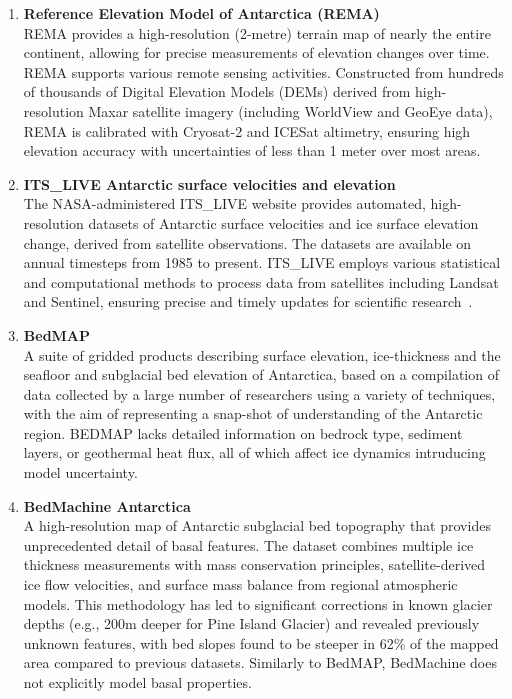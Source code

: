 \begin{enumerate}
    \item\textbf{Reference Elevation Model of Antarctica (REMA)}\\
    REMA provides a high-resolution (2-metre) terrain map of nearly the entire continent, allowing for precise measurements of elevation changes over time. REMA supports various remote sensing activities. Constructed from hundreds of thousands of Digital Elevation Models (DEMs) derived from high-resolution Maxar satellite imagery (including WorldView and GeoEye data), REMA is calibrated with Cryosat-2 and ICESat altimetry, ensuring high elevation accuracy with uncertainties of less than 1 meter over most areas\cite{REMA}.

    \item\textbf{ITS\_LIVE Antarctic surface velocities and elevation}\\
    The NASA-administered ITS\_LIVE website provides automated, high-resolution datasets of Antarctic surface velocities and ice surface elevation change, derived from satellite observations. The datasets are available on annual timesteps from 1985 to present. ITS\_LIVE employs various statistical and computational methods to process data from satellites including Landsat and Sentinel, ensuring precise and timely updates for scientific research~\cite{itslive}.

    \item\textbf{BedMAP}\\ 
    A suite of gridded products describing surface elevation, ice-thickness and the seafloor and subglacial bed elevation of Antarctica, based on a compilation of data collected by a large number of researchers using a variety of techniques, with the aim of representing a snap-shot of understanding of the Antarctic region\cite{Fretwell_2013}. BEDMAP lacks detailed information on bedrock type, sediment layers, or geothermal heat flux, all of which affect ice dynamics intruducing model uncertainty.

    \item\textbf{BedMachine Antarctica}\\
    A high-resolution map of Antarctic subglacial bed topography that provides unprecedented detail of basal features. The dataset combines multiple ice thickness measurements with mass conservation principles, satellite-derived ice flow velocities, and surface mass balance from regional atmospheric models. This methodology has led to significant corrections in known glacier depths (e.g., 200m deeper for Pine Island Glacier) and revealed previously unknown features, with bed slopes found to be steeper in 62\% of the mapped area compared to previous datasets\cite{Morlighem_2020}. Similarly to BedMAP, BedMachine does not explicitly model basal properties.


\end{enumerate}
